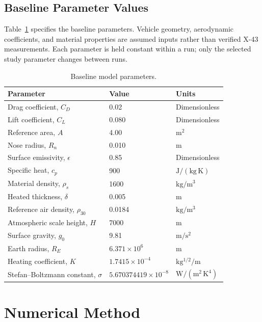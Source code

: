 \documentclass[conf]{new-aiaa}
\begin{document}
\subsection{Baseline Parameter Values}

Table~\ref{tab:baseline-parameters} specifies the baseline parameters.
Vehicle geometry, aerodynamic coefficients, and material properties are
assumed inputs rather than verified X-43 measurements. Each parameter is
held constant within a run; only the selected study parameter changes
between runs.

\begin{table}[htbp]
\caption{Baseline model parameters.}
\label{tab:baseline-parameters}
\centering
\begin{tabular}{lll}
\hline
Parameter & Value & Units \\
\hline
Drag coefficient, $C_D$ & 0.02 & Dimensionless \\
Lift coefficient, $C_L$ & 0.080 & Dimensionless \\
Reference area, $A$ & 4.00 & $\mathrm{m^2}$ \\
Nose radius, $R_n$ & 0.010 & $\mathrm{m}$ \\
Surface emissivity, $\epsilon$ & 0.85 & Dimensionless \\
Specific heat, $c_p$ & 900 & $\mathrm{J/(kg\,K)}$ \\
Material density, $\rho_s$ & 1600 & $\mathrm{kg/m^3}$ \\
Heated thickness, $\delta$ & 0.005 & $\mathrm{m}$ \\
Reference air density, $\rho_{30}$ & 0.0184 & $\mathrm{kg/m^3}$ \\
Atmospheric scale height, $H$ & 7000 & $\mathrm{m}$ \\
Surface gravity, $g_0$ & 9.81 & $\mathrm{m/s^2}$ \\
Earth radius, $R_E$ & $6.371\times10^6$ & $\mathrm{m}$ \\
Heating coefficient, $K$ & $1.7415\times10^{-4}$ & $\mathrm{kg^{1/2}/m}$ \\
Stefan--Boltzmann constant, $\sigma$ & $5.670374419\times10^{-8}$ & $\mathrm{W/(m^2\,K^4)}$ \\
\hline
\end{tabular}
\end{table}

\section{Numerical Method}
\end{document}
